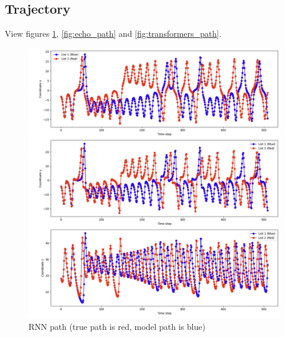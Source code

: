 \documentclass[11pt]{article}
\begin{document}
\subsection{Trajectory}
View figures \ref{fig:rnn_path}, \ref{fig:echo_path} and \ref{fig:transformers_path}.
\begin{figure}
    \centering
    \begin{minipage}[b]{0.49\textwidth}
        \includegraphics[width=\linewidth]{rnn_path.jpeg}
        \caption{RNN path (true path is red, model path is blue)}
        \label{fig:rnn_path}
    \end{minipage}
    \hfill
    \begin{minipage}[b]{0.49\textwidth}

\end{minipage}
\end{figure}
\end{document}
